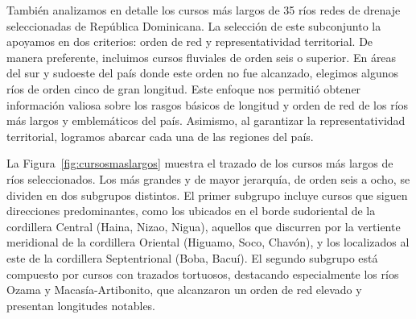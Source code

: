 \documentclass[spanish]{article}
\begin{document}
También analizamos en detalle los cursos más largos de 35 ríos redes de
drenaje seleccionadas de República Dominicana. La selección de este
subconjunto la apoyamos en dos criterios: orden de red y
representatividad territorial. De manera preferente, incluimos cursos
fluviales de orden seis o superior. En áreas del sur y sudoeste del país
donde este orden no fue alcanzado, elegimos algunos ríos de orden cinco
de gran longitud. Este enfoque nos permitió obtener información valiosa
sobre los rasgos básicos de longitud y orden de red de los ríos más
largos y emblemáticos del país. Asimismo, al garantizar la
representatividad territorial, logramos abarcar cada una de las regiones
del país.

La Figura~\ref{fig:cursosmaslargos} muestra el trazado de los cursos más
largos de ríos seleccionados. Los más grandes y de mayor jerarquía, de
orden seis a ocho, se dividen en dos subgrupos distintos. El primer
subgrupo incluye cursos que siguen direcciones predominantes, como los
ubicados en el borde sudoriental de la cordillera Central (Haina, Nizao,
Nigua), aquellos que discurren por la vertiente meridional de la
cordillera Oriental (Higuamo, Soco, Chavón), y los localizados al este
de la cordillera Septentrional (Boba, Bacuí). El segundo subgrupo está
compuesto por cursos con trazados tortuosos, destacando especialmente
los ríos Ozama y Macasía-Artibonito, que alcanzaron un orden de red
elevado y presentan longitudes notables.
\end{document}
